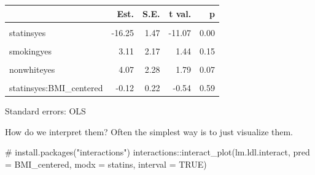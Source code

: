 \documentclass[
  letterpaper,
  DIV=11,
  numbers=noendperiod]{scrreport}
\newenvironment{Shaded}{\begin{snugshade}}{\end{snugshade}}
\newcommand{\AttributeTok}[1]{\textcolor[rgb]{0.40,0.45,0.13}{#1}}
\newcommand{\CommentTok}[1]{\textcolor[rgb]{0.37,0.37,0.37}{#1}}
\newcommand{\ConstantTok}[1]{\textcolor[rgb]{0.56,0.35,0.01}{#1}}
\newcommand{\FunctionTok}[1]{\textcolor[rgb]{0.28,0.35,0.67}{#1}}
\newcommand{\NormalTok}[1]{\textcolor[rgb]{0.00,0.23,0.31}{#1}}
\newcommand{\SpecialCharTok}[1]{\textcolor[rgb]{0.37,0.37,0.37}{#1}}
\begin{document}
\begin{table}[!h]
\centering
\begin{threeparttable}
\begin{tabular}{lrrrr}
\toprule
  & Est. & S.E. & t val. & p\\
\midrule
\cellcolor{gray!6}{(Intercept)} & \cellcolor{gray!6}{162.41} & \cellcolor{gray!6}{7.58} & \cellcolor{gray!6}{21.42} & \cellcolor{gray!6}{0.00}\\
statinsyes & -16.25 & 1.47 & -11.07 & 0.00\\
\cellcolor{gray!6}{age} & \cellcolor{gray!6}{-0.17} & \cellcolor{gray!6}{0.11} & \cellcolor{gray!6}{-1.56} & \cellcolor{gray!6}{0.12}\\
smokingyes & 3.11 & 2.17 & 1.44 & 0.15\\
\cellcolor{gray!6}{drinkanyyes} & \cellcolor{gray!6}{-2.08} & \cellcolor{gray!6}{1.47} & \cellcolor{gray!6}{-1.42} & \cellcolor{gray!6}{0.16}\\
\addlinespace
nonwhiteyes & 4.07 & 2.28 & 1.79 & 0.07\\
\cellcolor{gray!6}{statinsno:BMI\_centered} & \cellcolor{gray!6}{0.58} & \cellcolor{gray!6}{0.16} & \cellcolor{gray!6}{3.64} & \cellcolor{gray!6}{0.00}\\
statinsyes:BMI\_centered & -0.12 & 0.22 & -0.54 & 0.59\\
\bottomrule
\end{tabular}
\begin{tablenotes}
\item Standard errors: OLS
\end{tablenotes}
\end{threeparttable}
\end{table}

How do we interpret them? Often the simplest way is to just visualize
them.

\begin{Shaded}
\begin{Highlighting}[]
\CommentTok{\# install.packages("interactions")}
\NormalTok{interactions}\SpecialCharTok{::}\FunctionTok{interact\_plot}\NormalTok{(lm.ldl.interact,}
                            \AttributeTok{pred =}\NormalTok{ BMI\_centered, }\AttributeTok{modx =}\NormalTok{ statins,}
                            \AttributeTok{interval =} \ConstantTok{TRUE}\NormalTok{)}
\end{Highlighting}
\end{Shaded}
\end{document}
